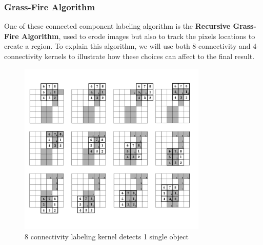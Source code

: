 
\subsubsection{Grass-Fire Algorithm}
One of these connected component labeling algorithm is the \textbf{Recursive Grass-Fire Algorithm}, used to erode images but also to track the pixels locations to create a region.
To explain this algorithm, we will use both 8-connectivity and 4-connectivity kernels to illustrate how these choices can affect to the final result.

\begin{figure}[htbp]
\centering
\includegraphics[width=0.8\textwidth]{Pictures/Theory/8connec_kernel.png}
\caption{8 connectivity labeling kernel detects 1 single object}
\label{fig:8connecK}
\end{figure}

